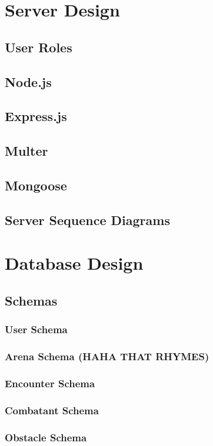 \documentclass[12pt,a4paper]{report}
\begin{document}
	\newpage
	\section{Server Design}
		\subsection{User Roles}
		\subsection{Node.js}
		\subsection{Express.js}
		\subsection{Multer}
		\subsection{Mongoose}
		\subsection{Server Sequence Diagrams}
	
	\newpage
	\section{Database Design}
		\subsection{Schemas}
			\subsubsection{User Schema}
			\subsubsection{Arena Schema (HAHA THAT RHYMES)}
			\subsubsection{Encounter Schema}
			\subsubsection{Combatant Schema}
			\subsubsection{Obstacle Schema}
	
\end{document}
